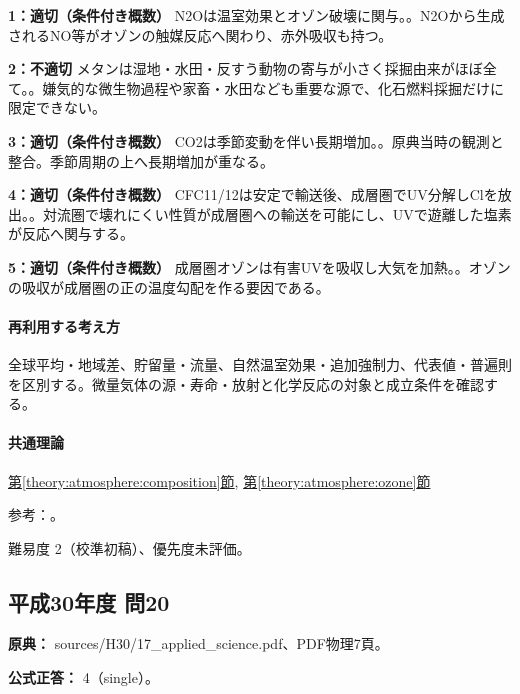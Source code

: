 \noindent\textbf{1：適切（条件付き概数）} N2Oは温室効果とオゾン破壊に関与。。N2Oから生成されるNO等がオゾンの触媒反応へ関わり、赤外吸収も持つ。\par

\noindent\textbf{2：不適切} メタンは湿地・水田・反すう動物の寄与が小さく採掘由来がほぼ全て。。嫌気的な微生物過程や家畜・水田なども重要な源で、化石燃料採掘だけに限定できない。\par

\noindent\textbf{3：適切（条件付き概数）} CO2は季節変動を伴い長期増加。。原典当時の観測と整合。季節周期の上へ長期増加が重なる。\par

\noindent\textbf{4：適切（条件付き概数）} CFC11/12は安定で輸送後、成層圏でUV分解しClを放出。。対流圏で壊れにくい性質が成層圏への輸送を可能にし、UVで遊離した塩素が反応へ関与する。\par

\noindent\textbf{5：適切（条件付き概数）} 成層圏オゾンは有害UVを吸収し大気を加熱。。オゾンの吸収が成層圏の正の温度勾配を作る要因である。\par

\paragraph{再利用する考え方} 全球平均・地域差、貯留量・流量、自然温室効果・追加強制力、代表値・普遍則を区別する。微量気体の源・寿命・放射と化学反応の対象と成立条件を確認する。

\paragraph{共通理論} \hyperref[theory:atmosphere:composition]{第\ref*{theory:atmosphere:composition}節}, \hyperref[theory:atmosphere:ozone]{第\ref*{theory:atmosphere:ozone}節}

\par 参考：\cite{atm_noaa_ghg,atm_jma_ozone}。

\par 難易度 2（校準初稿）、優先度未評価。

\subsection{平成30年度 問20}
\label{q:h30-reg-applied-20}

\noindent\textbf{原典：} sources/H30/17\_applied\_science.pdf、PDF物理7頁。

\textbf{公式正答：} 4（single）。

